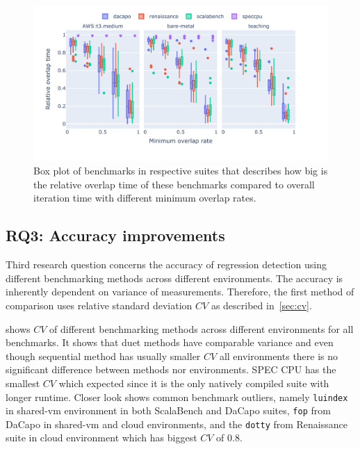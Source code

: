 \begin{figure}
	\centering
	\includegraphics[width=1\linewidth]{./figures/relative_overlap_time.pdf}
	\caption{
		Box plot of benchmarks in respective suites that describes how big is the relative overlap time of these benchmarks compared to overall iteration time with different minimum overlap rates.
	}
	\label{fig:relative_overlap_time}
\end{figure}


\subsection{RQ3: Accuracy improvements}
\label{sec:rq3}

Third research question concerns the accuracy of regression detection using different benchmarking methods across different environments.
The accuracy is inherently dependent on variance of measurements.
Therefore, the first method of comparison uses relative standard deviation $CV$ as described in~\cref{sec:cv}.

 shows $CV$ of different benchmarking methods across different environments for all benchmarks.
It shows that duet methods have comparable variance and even though sequential method has usually smaller $CV$ all environments there is no significant difference between methods nor environments.
SPEC CPU has the smallest $CV$ which expected since it is the only natively compiled suite with longer runtime.
Closer look shows common benchmark outliers, namely \lstinline{luindex} in shared-vm environment in both ScalaBench and DaCapo suites, \lstinline{fop} from DaCapo in shared-vm and cloud environments, and the \lstinline{dotty} from Renaissance suite in cloud environment which has biggest $CV$ of $0.8$.

